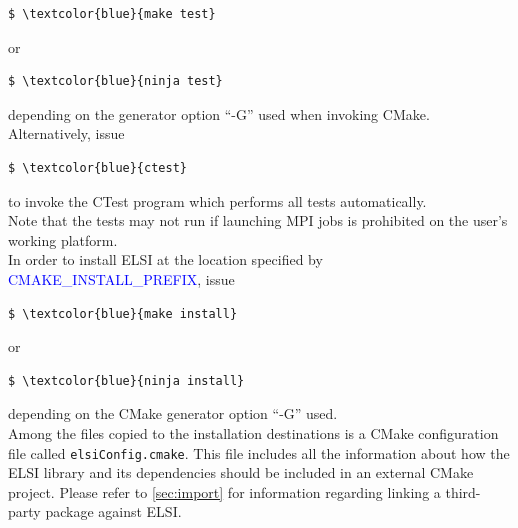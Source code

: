 \documentclass{report}
\begin{document}
\begin{Verbatim}[commandchars=\\\{\}]
$ \textcolor{blue}{make test}
\end{Verbatim}

or\\

\begin{Verbatim}[commandchars=\\\{\}]
$ \textcolor{blue}{ninja test}
\end{Verbatim}

depending on the generator option ``-G'' used when invoking CMake.  Alternatively, issue\\

\begin{Verbatim}[commandchars=\\\{\}]
$ \textcolor{blue}{ctest}
\end{Verbatim}

to invoke the CTest program which performs all tests automatically.\\

Note that the tests may not run if launching MPI jobs is prohibited on the user's working platform.\\

In order to install ELSI at the location specified by \textcolor{blue}{CMAKE\_INSTALL\_PREFIX}, issue\\

\begin{Verbatim}[commandchars=\\\{\}]
$ \textcolor{blue}{make install}
\end{Verbatim}

or\\

\begin{Verbatim}[commandchars=\\\{\}]
$ \textcolor{blue}{ninja install}
\end{Verbatim}

depending on the CMake generator option ``-G'' used.\\

Among the files copied to the installation destinations is a CMake configuration file called \texttt{elsiConfig.cmake}.  This file includes all the information about how the ELSI library and its dependencies should be included in an external CMake project.  Please refer to \ref{sec:import} for information regarding linking a third-party package against ELSI.\\
\end{document}
